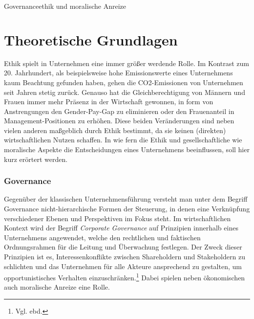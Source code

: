 \documentclass[12pt]{article}
\begin{document}
\renewcommand{\mytitle}{Governanceethik und\\moralische Anreize}%
\renewcommand{\myauthor}{Lennart Schulte-Kellinghaus,\\Timo Stovermann}%
\renewcommand{\headheight}{27pt}%

%
\begin{center}
\LARGE{Governanceethik und moralische Anreize}
\end{center}
\clearpage
\frontmatter%


\printabbreviations%
\clearpage
\renewcommand{\plaintitle}{Inhaltsverzeichnis}%
{\def\makebox[#1][#2]#3{#3}%
	\tableofcontents
}


\clearpage
\mainmatter%

\part{Theoretische Grundlagen}
Ethik spielt in Unternehmen eine immer größer werdende Rolle. Im Kontrast zum 20. Jahrhundert, als beispielsweise hohe Emissionswerte eines Unternehmens kaum Beachtung gefunden haben, gehen die CO2-Emissionen von Unternehmen seit Jahren stetig zurück. Genauso hat die Gleichberechtigung von Männern und Frauen immer mehr Präsenz in der Wirtschaft gewonnen, in form von Anstrengungen den Gender-Pay-Gap zu eliminieren oder den Frauenanteil in Management-Positionen zu erhöhen. Diese beiden Veränderungen sind neben vielen anderen maßgeblich durch Ethik bestimmt, da sie keinen (direkten) wirtschaftlichen Nutzen schaffen. In wie fern die Ethik und gesellschaftliche wie moralische Aspekte die Entscheidungen eines Unternehmens beeinflussen, soll hier kurz erörtert werden.
\section{Governance}
Gegenüber der klassischen Unternehmensführung versteht man unter dem Begriff Governance nicht-hierarchische Formen der Steuerung, in denen eine Verknüpfung verschiedener Ebenen und Perspektiven im Fokus steht. Im wirtschaftlichen Kontext wird der Begriff \textit{Corporate Governance} auf Prinzipien innerhalb eines Unternehmens angewendet, welche den rechtlichen und faktischen Ordnungsrahmen für die Leitung und Überwachung festlegen. Der Zweck dieser Prinzipien ist es, Interessenkonflikte zwischen Shareholdern und Stakeholdern zu schlichten und das Unternehmen für alle Akteure ansprechend zu gestalten, um opportunistisches Verhalten einzuschränken.\footnote{Vgl. ebd.} Dabei spielen neben ökonomischen auch moralische Anreize eine Rolle.
\end{document}
